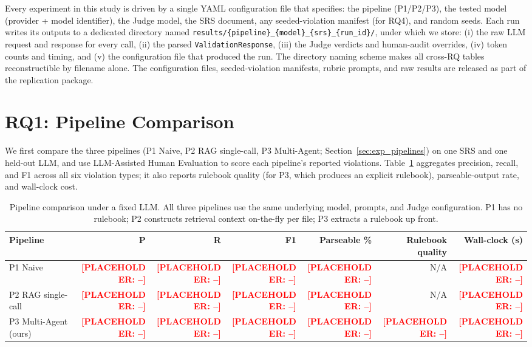 \documentclass[smallextended]{svjour3}
\newcommand{\placeholder}[1]{\textcolor{red}{\textbf{[PLACEHOLDER: #1]}}}
\begin{document}
Every experiment in this study is driven by a single YAML configuration file that specifies: the pipeline (P1/P2/P3), the tested model (provider + model identifier), the Judge model, the SRS document, any seeded-violation manifest (for RQ4), and random seeds.
Each run writes its outputs to a dedicated directory named \texttt{results/\{pipeline\}\_\{model\}\_\{srs\}\_\{run\_id\}/}, under which we store: (i) the raw LLM request and response for every call, (ii) the parsed \texttt{ValidationResponse}, (iii) the Judge verdicts and human-audit overrides, (iv) token counts and timing, and (v) the configuration file that produced the run.
The directory naming scheme makes all cross-RQ tables reconstructible by filename alone.
The configuration files, seeded-violation manifests, rubric prompts, and raw results are released as part of the replication package.

\section{RQ1: Pipeline Comparison}
\label{sec:results_rq1}

We first compare the three pipelines (P1 Naive, P2 RAG single-call, P3 Multi-Agent; Section~\ref{sec:exp_pipelines}) on one SRS and one held-out LLM, and use LLM-Assisted Human Evaluation to score each pipeline's reported violations.
Table~\ref{tab:rq1_pipeline} aggregates precision, recall, and F1 across all six violation types; it also reports rulebook quality (for P3, which produces an explicit rulebook), parseable-output rate, and wall-clock cost.

\begin{table}[t]
\caption{Pipeline comparison under a fixed LLM. All three pipelines use the same underlying model, prompts, and Judge configuration. P1 has no rulebook; P2 constructs retrieval context on-the-fly per file; P3 extracts a rulebook up front.}
\label{tab:rq1_pipeline}
\centering
\begin{tabular}{l r r r r r r}
\toprule
\textbf{Pipeline} & \textbf{P} & \textbf{R} & \textbf{F1} & \textbf{Parseable \%} & \textbf{Rulebook quality} & \textbf{Wall-clock (s)} \\
\midrule
P1 Naive               & \placeholder{--} & \placeholder{--} & \placeholder{--} & \placeholder{--} & N/A & \placeholder{--} \\
P2 RAG single-call     & \placeholder{--} & \placeholder{--} & \placeholder{--} & \placeholder{--} & N/A & \placeholder{--} \\
P3 Multi-Agent (ours)  & \placeholder{--} & \placeholder{--} & \placeholder{--} & \placeholder{--} & \placeholder{--} & \placeholder{--} \\
\bottomrule
\end{tabular}
\end{table}
\end{document}
